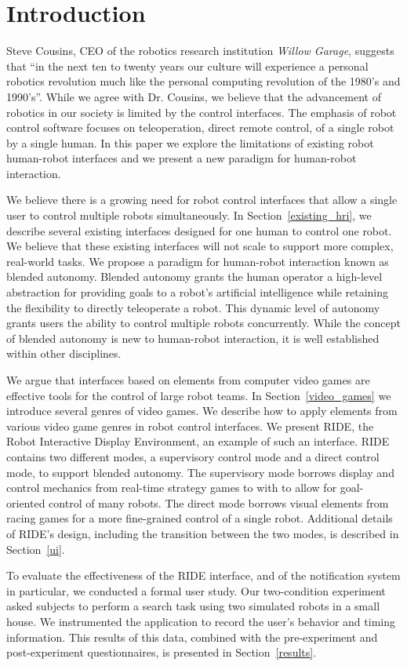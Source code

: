 \chapter{Introduction}
Steve Cousins, CEO of the robotics research institution \emph{Willow Garage}, suggests that ``in the next ten to twenty years our culture will experience a personal robotics revolution much like the personal computing revolution of the 1980's and 1990's''. \cite{Cousins} While we agree with Dr. Cousins, we believe that the advancement of robotics in our society is limited by the control interfaces. The emphasis of robot control software focuses on teleoperation, direct remote control, of a single robot by a single human. In this paper we explore the limitations of existing robot human-robot interfaces and we present a new paradigm for human-robot interaction.

We believe there is a growing need for robot control interfaces that allow a single user to control multiple robots simultaneously. In Section~\ref{existing_hri}, we describe several existing interfaces designed for one human to control one robot. We believe that these existing interfaces will not scale to support more complex, real-world tasks. We propose a paradigm for human-robot interaction known as blended autonomy. Blended autonomy grants the human operator a high-level abstraction for providing goals to a robot's artificial intelligence while retaining the flexibility to directly teleoperate a robot. This dynamic level of autonomy grants users the ability to control multiple robots concurrently. While the concept of blended autonomy is new to human-robot interaction, it is well established within other disciplines.

We argue that interfaces based on elements from computer video games are effective tools for the control of large robot teams. In Section~\ref{video_games} we introduce several genres of video games. We describe how to apply elements from various video game genres in robot control interfaces. We present RIDE, the Robot Interactive Display Environment, an example of such an interface. RIDE contains two different modes, a supervisory control mode and a direct control mode, to support blended autonomy. The supervisory mode borrows display and control mechanics from real-time strategy games to with to allow for goal-oriented control of many robots. The direct mode borrows visual elements from racing games for a more fine-grained control of a single robot. Additional details of RIDE's design, including the transition between the two modes, is described in Section~\ref{ui}.

To evaluate the effectiveness of the RIDE interface, and of the notification system in particular, we conducted a formal user study. Our two-condition experiment asked subjects to perform a search task using two simulated robots in a small house. We instrumented the application to record the user's behavior and timing information. This results of this data, combined with the pre-experiment and post-experiment questionnaires, is presented in Section~\ref{results}.